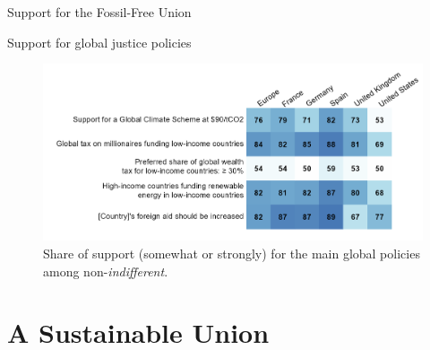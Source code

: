 \documentclass[aspectratio=169,xcolor=dvipsnames, 11pt,mathserif]{beamer}
\begin{document}
\begin{frame}{Support for the Fossil-Free Union}
\end{frame}

\begin{frame}{Support for global justice policies\label{support}\hyperlink{support_more}{}}
	\vspace{-.3cm}
	\begin{figure}[h!]
		\centering		
		\caption{Share of support (somewhat or strongly) for the main global policies among non-\textit{indifferent}.  
        }
        \vspace{-.2cm}
		\includegraphics[width=\textwidth]{../figures/country_comparison/few_main_share.png} %
		\end{figure} 
\end{frame}

    

\section{A Sustainable Union}
\end{document}

